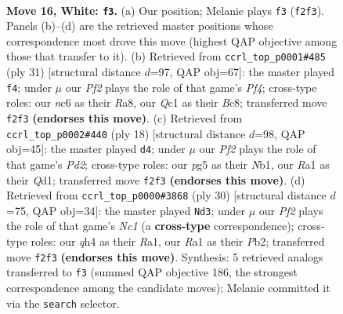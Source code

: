 \documentclass[11pt]{article}
\begin{document}
\begin{figure}[p]
\label{fig:thought-m28}
\end{figure}

\clearpage

\begin{figure}[p]\centering
\begin{subfigure}{0.46\textwidth}\centering
\resizebox{\linewidth}{!}{%
\newchessgame
\chessboard[
  setfen={r1b1kb1r/1pp5/1nn5/6pp/p4p1q/2NP4/PP1BPPB1/R1Q1NRK1 w kq - 0 16},
  showmover=false,
  pgfstyle=straightmove, color=movearrow, markmove={f2-f3}
]}
\caption{}
\end{subfigure}\hfill
\begin{subfigure}{0.46\textwidth}\centering
\resizebox{\linewidth}{!}{%
\newchessgame
\chessboard[
  setfen={r1bqnrk1/p1n1b1pp/1p6/3p1p2/3P4/2N1NPPB/PPQ4P/R1B2R1K b - - 1 16},
  showmover=false,
  pgfstyle=straightmove, color=movearrow, markmove={f5-f4}
]}
\caption{}
\end{subfigure}
\\[4pt]
\begin{subfigure}{0.46\textwidth}\centering
\resizebox{\linewidth}{!}{%
\newchessgame
\chessboard[
  setfen={r1bqkb1r/1p3ppp/p3pn2/2p5/1nP5/4PN2/PB1PB1PP/RN1Q1RK1 w kq - 0 10},
  showmover=false,
  pgfstyle=straightmove, color=movearrow, markmove={d2-d4}
]}
\caption{}
\end{subfigure}\hfill
\begin{subfigure}{0.46\textwidth}\centering
\resizebox{\linewidth}{!}{%
\newchessgame
\chessboard[
  setfen={1rb1k2r/2q1bpp1/2p1nn2/1p2p2p/4P3/2N1BP2/1PP1BQPP/R1N2RK1 w k - 2 16},
  showmover=false,
  pgfstyle=straightmove, color=movearrow, markmove={c1-d3}
]}
\caption{}
\end{subfigure}
\caption{\textbf{Move 16, White: \texttt{f3}.} (a) Our position; Melanie plays \texttt{f3} (\texttt{f2f3}). Panels (b)--(d) are the retrieved master positions whose correspondence most drove this move (highest QAP objective among those that transfer to it). (b) Retrieved from \texttt{ccrl\_top\_p0001\#485} (ply 31) [structural distance $d$=97, QAP obj=67]: the master played \texttt{f4}; under $\mu$ our \emph{Pf2} plays the role of that game's \emph{Pf4}; cross-type roles: our \emph{n}c6 as their \emph{R}a8, our \emph{Q}c1 as their \emph{B}c8; transferred move \texttt{f2f3} \textbf{(endorses this move)}. (c) Retrieved from \texttt{ccrl\_top\_p0002\#440} (ply 18) [structural distance $d$=98, QAP obj=45]: the master played \texttt{d4}; under $\mu$ our \emph{Pf2} plays the role of that game's \emph{Pd2}; cross-type roles: our \emph{p}g5 as their \emph{N}b1, our \emph{R}a1 as their \emph{Q}d1; transferred move \texttt{f2f3} \textbf{(endorses this move)}. (d) Retrieved from \texttt{ccrl\_top\_p0000\#3868} (ply 30) [structural distance $d$=75, QAP obj=34]: the master played \texttt{Nd3}; under $\mu$ our \emph{Pf2} plays the role of that game's \emph{Nc1} (a \textbf{cross-type} correspondence); cross-type roles: our \emph{q}h4 as their \emph{R}a1, our \emph{R}a1 as their \emph{P}b2; transferred move \texttt{f2f3} \textbf{(endorses this move)}. Synthesis: 5 retrieved analogs transferred to \texttt{f3} (summed QAP objective 186, the strongest correspondence among the candidate moves); Melanie committed it via the \texttt{search} selector.}

\end{figure}
\end{document}
